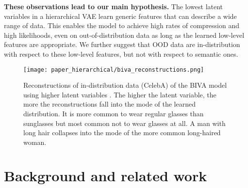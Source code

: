 {\textbf{These observations lead to our main hypothesis.}
The lowest latent variables in a hierarchical VAE learn generic features that can describe a wide range of data.
This enables the model to achieve high rates of compression and high likelihoods, even on out-of-distribution data as long as the learned low-level features are appropriate.
We further suggest that OOD data are in-distribution with respect to these low-level features, but not with respect to semantic ones.

\begin{figure}[t]
    \centering
    \texttt{[image: paper\_hierarchical/biva\_reconstructions.png]}
    \vspace{0mm}
    \caption[Reconstructions of in-distribution data (CelebA) of the BIVA model using higher latent variables.]{Reconstructions of in-distribution data (CelebA) of the BIVA model using higher latent variables  \parencite{maaloe_biva_2019}.
    The higher the latent variable, the more the reconstructions fall into the mode of the learned distribution.
    It is more common to wear regular glasses than sunglasses but most common not to wear glasses at all.
    A man with long hair collapses into the mode of the more common long-haired woman.}
    \vspace{0mm}
    \label{fig_hierarchical:biva-reconstructions-celeba}
\end{figure}

\vspace{0cm}
\section{Background and related work}

}
